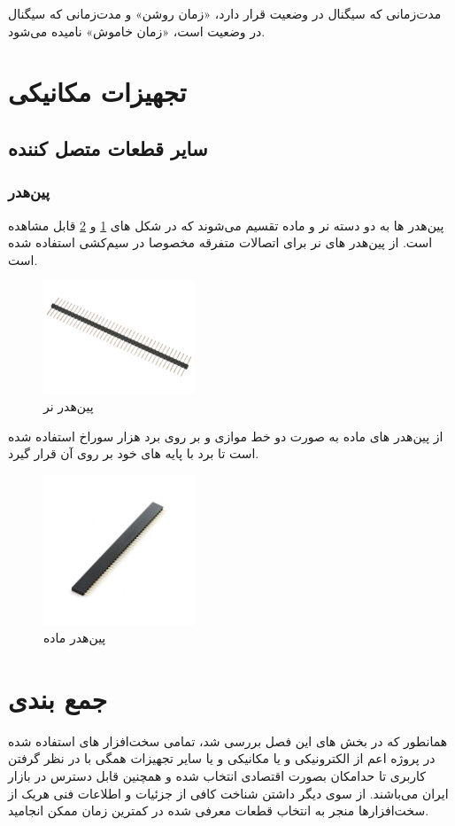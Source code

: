مدت‌زمانی که سیگنال در وضعیت  قرار دارد، «زمان روشن» و مدت‌زمانی که سیگنال در وضعیت  است، «زمان خاموش»  نامیده می‌شود.

\section{تجهیزات مکانیکی}

\subsection{سایر قطعات متصل کننده}
\subsubsection{پین‌هدر}
پین‌هدر ها به دو دسته نر و ماده تقسیم می‌شوند که در شکل های
\ref{پین‌هدر نر}
و
\ref{پین‌هدر ماده}
قابل مشاهده است. از پین‌هدر های نر برای اتصالات متفرقه مخصوصا در سیم‌کشی استفاده شده است.
\begin{figure}[H]
	\centering
	\includegraphics[width=0.4\textwidth]{./images/Chapter4/PinHeaderMale}
	\caption[پین‌هدر نر]{پین‌هدر نر \cite{PinHeaderMale}}
	\label{پین‌هدر نر}
\end{figure}
 از پین‌هدر های ماده به صورت دو خط موازی و بر روی برد هزار سوراخ استفاده شده است تا برد
 با پایه های خود بر روی آن قرار گیرد.
\begin{figure}[H]
	\centering
	\includegraphics[width=0.4\textwidth]{./images/Chapter4/PinHeaderFemale}
	\caption[پین‌هدر ماده]{پین‌هدر ماده\cite{PinHeaderFemale}}
	\label{پین‌هدر ماده}
\end{figure}
\section{جمع بندی}
همانطور که در بخش های این فصل بررسی شد، تمامی سخت‌افزار های استفاده شده در پروژه اعم از الکترونیکی و یا مکانیکی و یا سایر تجهیزات همگی با در نظر گرفتن کاربری تا حدامکان بصورت اقتصادی انتخاب شده و همچنین قابل دسترس در بازار ایران می‌باشند.
از سوی دیگر داشتن شناخت کافی از جزئیات و اطلاعات فنی هریک از سخت‌افزار‌ها منجر به انتخاب  قطعات معرفی شده در کمترین زمان ممکن انجامید.

